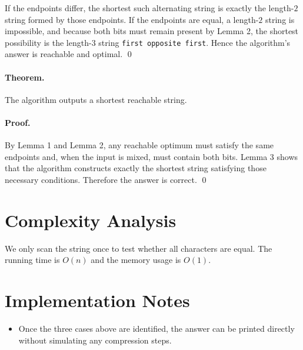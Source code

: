 \documentclass[11pt]{article}
\begin{document}
If the endpoints differ, the shortest such alternating string is exactly the length-$2$ string formed
by those endpoints. If the endpoints are equal, a length-$2$ string is impossible, and because both
bits must remain present by Lemma 2, the shortest possibility is the length-$3$ string
\texttt{first opposite first}. Hence the algorithm's answer is reachable and optimal. \qed

\paragraph{Theorem.}
The algorithm outputs a shortest reachable string.

\paragraph{Proof.}
By Lemma 1 and Lemma 2, any reachable optimum must satisfy the same endpoints and, when the
input is mixed, must contain both bits. Lemma 3 shows that the algorithm constructs exactly the
shortest string satisfying those necessary conditions. Therefore the answer is correct. \qed

\section*{Complexity Analysis}

We only scan the string once to test whether all characters are equal. The running time is $O(n)$
and the memory usage is $O(1)$.

\section*{Implementation Notes}

\begin{itemize}[leftmargin=*]
    \item Once the three cases above are identified, the answer can be printed directly without
    simulating any compression steps.
\end{itemize}
\end{document}
